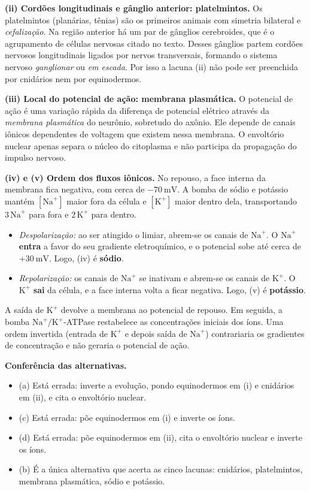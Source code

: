 \documentclass{article}%
\begin{document}
\textbf{(ii) Cordões longitudinais e gânglio anterior: platelmintos.} Os platelmintos (planárias, tênias) são os primeiros animais com simetria bilateral e \emph{cefalização}. Na região anterior há um par de gânglios cerebroides, que é o agrupamento de células nervosas citado no texto. Desses gânglios partem cordões nervosos longitudinais ligados por nervos transversais, formando o sistema nervoso \emph{ganglionar} ou \emph{em escada}. Por isso a lacuna (ii) não pode ser preenchida por cnidários nem por equinodermos.

\textbf{(iii) Local do potencial de ação: membrana plasmática.} O potencial de ação é uma variação rápida da diferença de potencial elétrico através da \emph{membrana plasmática} do neurônio, sobretudo do axônio. Ele depende de canais iônicos dependentes de voltagem que existem nessa membrana. O envoltório nuclear apenas separa o núcleo do citoplasma e não participa da propagação do impulso nervoso.

\textbf{(iv) e (v) Ordem dos fluxos iônicos.} No repouso, a face interna da membrana fica negativa, com cerca de $-70\ \text{mV}$. A bomba de sódio e potássio mantém $[\text{Na}^+]$ maior fora da célula e $[\text{K}^+]$ maior dentro dela, transportando $3\,\text{Na}^+$ para fora e $2\,\text{K}^+$ para dentro.
\begin{itemize}
\item \emph{Despolarização:} ao ser atingido o limiar, abrem-se os canais de $\text{Na}^+$. O $\text{Na}^+$ \textbf{entra} a favor do seu gradiente eletroquímico, e o potencial sobe até cerca de $+30\ \text{mV}$. Logo, (iv) é \textbf{sódio}.
\item \emph{Repolarização:} os canais de $\text{Na}^+$ se inativam e abrem-se os canais de $\text{K}^+$. O $\text{K}^+$ \textbf{sai} da célula, e a face interna volta a ficar negativa. Logo, (v) é \textbf{potássio}.
\end{itemize}
A saída de $\text{K}^+$ devolve a membrana ao potencial de repouso. Em seguida, a bomba $\text{Na}^+/\text{K}^+$-ATPase restabelece as concentrações iniciais dos íons. Uma ordem invertida (entrada de $\text{K}^+$ e depois saída de $\text{Na}^+$) contrariaria os gradientes de concentração e não geraria o potencial de ação.

\textbf{Conferência das alternativas.}
\begin{itemize}
\item (a) Está errada: inverte a evolução, pondo equinodermos em (i) e cnidários em (ii), e cita o envoltório nuclear.
\item (c) Está errada: põe equinodermos em (i) e inverte os íons.
\item (d) Está errada: põe equinodermos em (ii), cita o envoltório nuclear e inverte os íons.
\item (b) É a única alternativa que acerta as cinco lacunas: cnidários, platelmintos, membrana plasmática, sódio e potássio.
\end{itemize}
\end{document}
